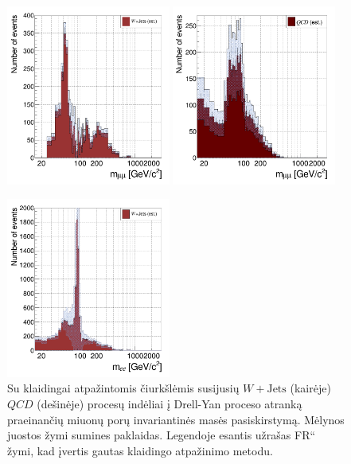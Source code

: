\documentclass[a4paper, 12pt, oneside]{article}
\newcommand{\WJets}{W\! +\!\mathrm{Jets}}
\newcommand{\ltq}[1]{{\quotedblbase{}#1\textquotedblleft{}}}
\newcommand{\QCD}{QC\! D}
\newlength\q
\begin{document}
\begin{figure}[t!]
	\RawFloats
	\includegraphics[width=0.48\textwidth]{Magistrinis/WJETest_mumu_final.png}
	\includegraphics[width=0.48\textwidth]{Magistrinis/QCDest_mumu_final.png}
	\vspace{-0.3cm}
	\caption{\label{fig:JETmumu}
		Su klaidingai atpažintomis čiurkšlėmis susijusių $\WJets$ (kairėje) $\QCD$ (dešinėje) procesų indėliai į Drell-Yan proceso
		atranką praeinančių miuonų porų invariantinės masės pasiskirstymą.
		Mėlynos juostos žymi sumines paklaidas.
		Legendoje esantis užrašas \ltq{FR} žymi, kad įvertis gautas klaidingo atpažinimo metodu.
	}	
	\vspace{1cm}
	\includegraphics[width=0.48\textwidth]{Magistrinis/WJETest_ee_final.png}

\end{figure}
\end{document}
